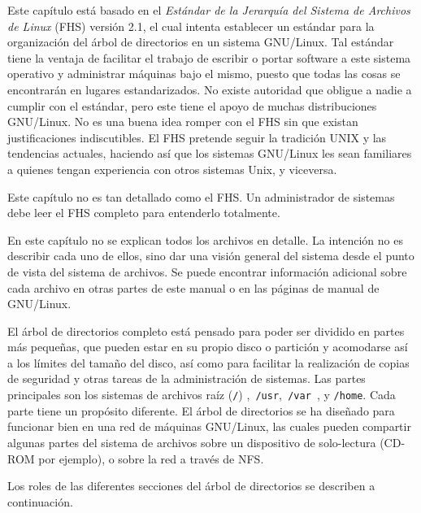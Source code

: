  Este capítulo está basado en el \textit{Estándar de la Jerarquía del
Sistema de Archivos de Linux} (FHS) versión 2.1, el cual intenta
establecer un estándar para la organización del árbol de directorios en un
sistema GNU/Linux. Tal estándar tiene la ventaja de facilitar el trabajo de
escribir o portar software a este sistema operativo y administrar máquinas bajo
el mismo, puesto que todas las cosas se encontrarán en lugares estandarizados.
No existe autoridad que obligue a nadie a cumplir con el estándar, pero este
tiene el apoyo de muchas distribuciones GNU/Linux. No es una buena idea romper
con el FHS sin que existan justificaciones indiscutibles. El FHS pretende seguir
la tradición UNIX y las tendencias actuales, haciendo así que los sistemas
GNU/Linux les sean familiares a quienes tengan experiencia con otros sistemas
Unix, y viceversa.  

 Este capítulo no es tan detallado como el FHS. Un administrador de
sistemas debe leer el FHS completo para entenderlo totalmente.  

 En este capítulo no se explican todos los archivos en detalle. La
intención no es describir cada uno de ellos, sino dar una visión general del
sistema desde el punto de vista del sistema de archivos.  Se puede encontrar
información adicional sobre cada archivo en otras partes de este manual o en las
páginas de manual de GNU/Linux.  

 El árbol de directorios completo está pensado para poder ser dividido en
partes más pequeñas, que pueden estar en su propio disco o partición y
acomodarse así a los límites del tamaño del disco, así como para facilitar la
realización de  copias de seguridad y otras tareas de la administración de
sistemas. Las partes principales son los sistemas de archivos raíz
(\texttt{/}) ,\texttt{ /usr},\texttt{ /var
}, y \texttt{/home}. Cada parte tiene un propósito
diferente. El árbol de directorios se ha diseñado para funcionar bien en una red
de máquinas GNU/Linux, las cuales pueden compartir algunas partes del sistema de
archivos sobre un dispositivo de solo-lectura (CD-ROM por ejemplo), o sobre la
red a través de NFS.  




 Los roles de las diferentes secciones del árbol de directorios se
describen a continuación.  

